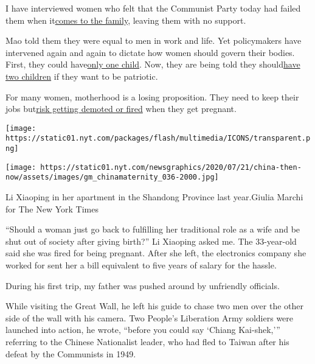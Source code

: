 I have interviewed women who felt that the Communist Party today had
failed them when
it\href{https://www.nytimes.com/2019/07/16/world/asia/china-women-discrimination.html}{}\href{https://www.nytimes.com/2019/07/16/world/asia/china-women-discrimination.html}{comes
to the family}, leaving them with no support.

Mao told them they were equal to men in work and life. Yet policymakers
have intervened again and again to dictate how women should govern their
bodies. First, they could
have\href{https://www.nytimes.com/2015/11/06/magazine/the-long-shadow-of-chinas-one-child-policy.html}{}\href{https://www.nytimes.com/2015/11/06/magazine/the-long-shadow-of-chinas-one-child-policy.html}{only
one child}. Now, they are being told they
should\href{https://www.nytimes.com/2018/08/11/world/asia/china-one-child-policy-birthrate.html}{}\href{https://www.nytimes.com/2018/08/11/world/asia/china-one-child-policy-birthrate.html}{have
two children} if they want to be patriotic.

For many women, motherhood is a losing proposition. They need to keep
their jobs
but\href{https://www.nytimes.com/2019/11/01/business/china-mothers-discrimination-working-.html}{}\href{https://www.nytimes.com/2019/11/01/business/china-mothers-discrimination-working-.html}{risk
getting demoted or fired} when they get pregnant.

\texttt{[image: https://static01.nyt.com/packages/flash/multimedia/ICONS/transparent.png]}

\texttt{[image: https://static01.nyt.com/newsgraphics/2020/07/21/china-then-now/assets/images/gm\_chinamaternity\_036-2000.jpg]}

Li Xiaoping in her apartment in the Shandong Province last year.Giulia
Marchi for The New York Times

``Should a woman just go back to fulfilling her traditional role as a
wife and be shut out of society after giving birth?'' Li Xiaoping asked
me. The 33-year-old said she was fired for being pregnant. After she
left, the electronics company she worked for sent her a bill equivalent
to five years of salary for the hassle.

During his first trip, my father was pushed around by unfriendly
officials.

While visiting the Great Wall, he left his guide to chase two men over
the other side of the wall with his camera. Two People's Liberation Army
soldiers were launched into action, he wrote, ``before you could say
`Chiang Kai-shek,''' referring to the Chinese Nationalist leader, who
had fled to Taiwan after his defeat by the Communists in 1949.

